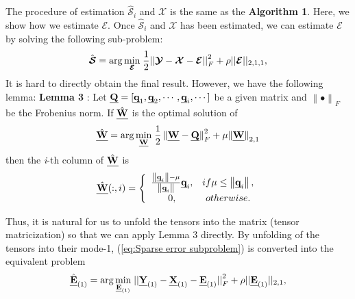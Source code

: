 \documentclass[twocolumn]{svjour3}          %
\begin{document}
    The procedure of estimation ${\hat{\boldsymbol{\mathcal{S}}}_i}$ and ${\boldsymbol{\mathcal{X}}}$ is the same as the \textbf{Algorithm 1}. Here, we show how we estimate ${\boldsymbol{\mathcal{E}}}$. Once ${\hat{\boldsymbol{\mathcal{S}}}_i}$ and ${\boldsymbol{\mathcal{X}}}$ has been estimated, we can estimate ${\boldsymbol{\mathcal{E}}}$ by solving the following sub-problem:
    \begin{equation}\label{eq:Sparse error subproblem}
    \begin{aligned}
    \setlength{\abovedisplayskip}{2pt}
    \setlength{\belowdisplayskip}{2pt}
    \hat{\boldsymbol{\mathcal{S}}} = \arg \mathop {\min }\limits_{\boldsymbol{\mathcal{E}}} {\kern 1pt} \frac{1}{2}{\rm{||}}{\boldsymbol{\mathcal{Y}}} - {\boldsymbol{\mathcal{X}}} - {\boldsymbol{\mathcal{E}}}{\rm{||}}_F^2 + \rho ||{\boldsymbol{\mathcal{E}}}|{|_{2,1,1}},
    \end{aligned}
    \end{equation}
    It is hard to directly obtain the final result. However, we have the following lemma:
    \noindent
    \textbf{Lemma 3} \cite{liu2013robust}: Let $\textbf{\emph{Q}} = [{\textbf{\emph{q}}_1},{\textbf{\emph{q}}_2}, \cdots ,{\textbf{\emph{q}}_i}, \cdots ]$ be a given matrix and ${\left\| \bullet \right\|_F}$ be the Frobenius norm. If $\hat{\textbf{\emph{W}}}$ is the optimal solution of
    $$\hat{\textbf{\emph{W}}} = \arg \mathop {\min }\limits_\textbf{\emph{W}} {\kern 1pt} \frac{1}{2}\left\| {\textbf{\emph{W}} - \textbf{\emph{Q}}} \right\|_F^2 + \mu {\left\| \textbf{\emph{W}} \right\|_{2,1}}$$
    then the \emph{i}-th column of $\hat{\textbf{\emph{W}}}$ is
    $$\hat{\textbf{\emph{W}}}(:,i) = \left\{ {\begin{array}{*{20}{c}}
    {\frac{{\left\| {{\textbf{\emph{q}}_i}} \right\| - \mu }}{{\left\| {{\textbf{\emph{q}}_i}} \right\|}}{\textbf{\emph{q}}_i},}&{if\mu  \le \left\| {{\textbf{\emph{q}}_i}} \right\|,}\\
    {0,}&{otherwise.}
    \end{array}} \right.$$

    Thus, it is natural for us to unfold the tensors into the matrix (tensor matricization) so that we can apply Lemma 3 directly. By unfolding of the tensors into their mode-1, (\ref{eq:Sparse error subproblem}) is converted into the equivalent problem
    \begin{equation}\label{eq:Sparse error subproblem2}
    \begin{aligned}
    {\hat{\textbf{\emph{E}}}_{(1)}} = \arg \mathop {\min }\limits_{{\textbf{\emph{E}}_{(1)}}} {\kern 1pt} {\rm{||}}{\textbf{\emph{Y}}_{(1)}} - {\textbf{\emph{X}}_{(1)}} - {\textbf{\emph{E}}_{(1)}}{\rm{||}}_F^2 + \rho ||{\textbf{\emph{E}}_{(1)}}|{|_{2,1}},
    \end{aligned}
    \end{equation}
\end{document}
